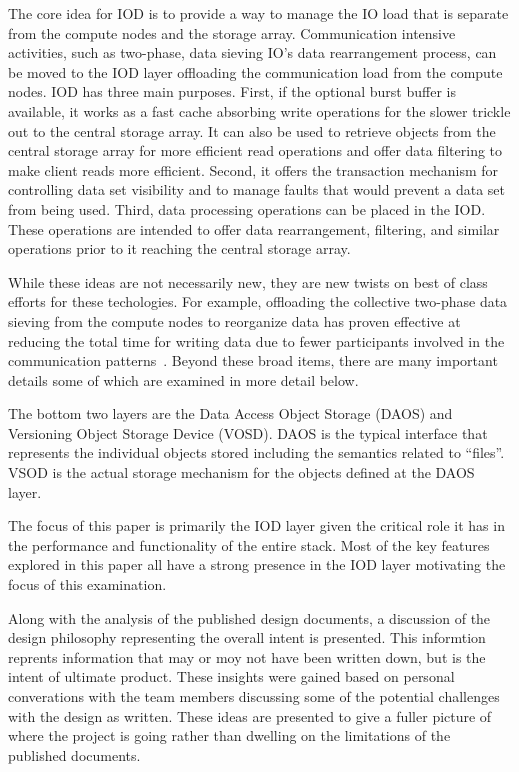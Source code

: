 \documentclass[conference]{sig-alt-gov2}
\begin{document}
The core idea for IOD is to provide a way to manage the IO load that is
separate from the compute nodes and the storage array. Communication intensive
activities, such as two-phase, data sieving IO's data rearrangement process,
can be moved to the IOD layer offloading the communication load from the
compute nodes. IOD has three main purposes. First, if the optional burst buffer
is available, it works as a fast cache absorbing write operations for the
slower trickle out to the central storage array. It can also be used to
retrieve objects from the central storage array for more efficient read
operations and offer data filtering to make client reads more efficient.
Second, it offers the transaction mechanism for controlling data set visibility
and to manage faults that would prevent a data set from being used. Third, data
processing operations can be placed in the IOD. These operations are intended
to offer data rearrangement, filtering, and similar operations prior to it
reaching the central storage array.

While these ideas are not necessarily new, they are new twists on best of class
efforts for these techologies. For example, offloading the collective two-phase
data sieving from the compute nodes to reorganize data has proven effective at
reducing the total time for writing data due to fewer participants involved in
the communication patterns~\cite{lofstead:2011:nessie-staging}.  Beyond these
broad items, there are many important details some of which are examined in
more detail below.

The bottom two layers are the Data Access Object Storage (DAOS) and Versioning
Object Storage Device (VOSD). DAOS is the typical interface that represents
the individual objects stored including the semantics related to ``files''.
VSOD is the actual storage mechanism for the objects defined at the DAOS layer.

The focus of this paper is primarily the IOD layer given the critical role it
has in the performance and functionality of the entire stack. Most of the key
features explored in this paper all have a strong presence in the IOD layer
motivating the focus of this examination.

Along with the analysis of the published design documents, a discussion of the
design philosophy representing the overall intent is presented. This informtion
reprents information that may or moy not have been written down, but is the 
intent of ultimate product. These insights were gained based on personal
converations with the team members discussing some of the potential challenges
with the design as written. These ideas are presented to give a fuller picture
of where the project is going rather than dwelling on the limitations of the
published documents.
\end{document}
